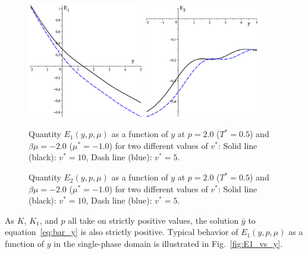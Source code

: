 \documentclass[12pt]{article}
\numberwithin{equation}{section}
\begin{document}
	\begin{figure}[htbp]
		\includegraphics[width=0.45\textwidth,angle=0]{E1_vs_y2}
		\hfill
		\includegraphics[width=0.45\textwidth,angle=0]{E2_vs_y}
		\\
		\parbox{0.45\textwidth}{\caption{\label{fig:E1_vs_y} Quantity $E_1(y,p,\mu)$ as a function of $y$ at $p=2.0$ ($T^*=0.5$) and $\beta\mu=-2.0$ ($\mu^*=-1.0$) for two different values of $v^*$: Solid line (black): $v^* = 10$, Dash line (blue): $v^* = 5$.}}
		\hfill
		\parbox{0.45\textwidth}{\caption{\label{fig:E2_vs_y} Quantity $E_2(y,p,\mu)$ as a function of $y$ at $p=2.0$ ($T^*=0.5$) and $\beta\mu=-2.0$ ($\mu^*=-1.0$) for two different values of $v^*$: Solid line (black): $v^* = 10$, Dash line (blue): $v^* = 5$.}}
	\end{figure}
	
	As $K$, $K_1$, and $p$ all take on strictly positive values, the solution $\bar{y}$ to equation~\eqref{eq:bar_y} is also strictly positive.
	Typical behavior of $E_1(y,p,\mu)$ as a function of $y$ in the single-phase domain is illustrated in Fig.~\ref{fig:E1_vs_y}.
	
\end{document}
